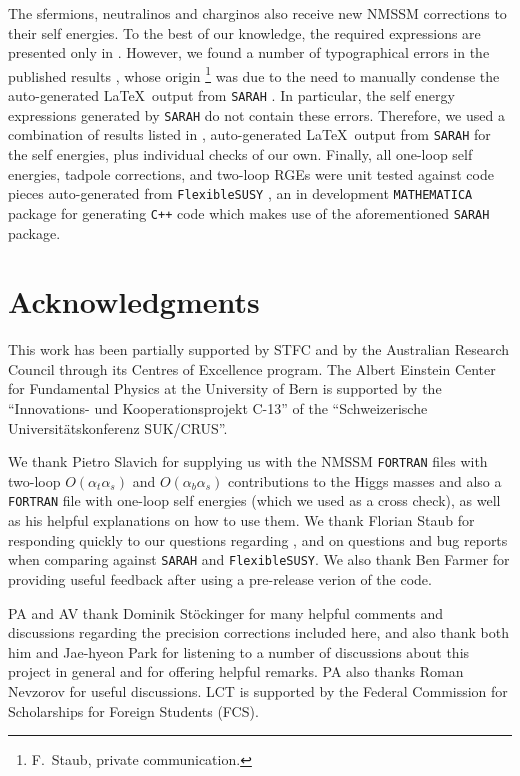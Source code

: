 \documentclass[final,3p,times,pdflatex]{elsarticle}
\def\at{\alpha_t}
\def\ab{\alpha_b}
\def\as{\alpha_s}
\def\oatas{O(\at\as)}
\def\oabas{O(\ab\as)}
\begin{document}
The sfermions, neutralinos and charginos also receive new NMSSM corrections to 
their self energies. To the best of our knowledge, the required expressions are 
presented only in \cite{Staub:2010ty}. However, we found a number of 
typographical errors in the published results \cite{Staub:2010ty}, whose 
origin%
\footnote{F.~Staub, private communication.} 
was due to the need to manually condense the auto-generated \LaTeX~output from 
{\tt SARAH} \cite{Staub:2009bi,Staub:2010jh,Staub:2012pb,Staub:2013tta}.  In 
particular, the self energy expressions generated by {\tt SARAH} do not contain 
these errors. Therefore, we used a combination of results listed in 
\cite{Staub:2010ty}, auto-generated \LaTeX~output from {\tt SARAH} for the self 
energies, plus individual checks of our own.
Finally, all one-loop self energies, tadpole corrections, and two-loop RGEs were
 unit tested against code pieces auto-generated from {\tt FlexibleSUSY} 
\cite{flexi-susy}, an in development {\tt MATHEMATICA} package for generating 
{\tt C++} code which makes use of the aforementioned {\tt SARAH} package. 


\section*{Acknowledgments}
This work has been partially supported by STFC 
and by the Australian Research Council through its Centres of Excellence 
program. The Albert Einstein Center for Fundamental Physics at the University 
of Bern is supported by the ``Innovations- und Kooperationsprojekt C-13'' of the
 ``Schweizerische Universit\"{a}tskonferenz SUK/CRUS''.

We thank Pietro Slavich for supplying us with the NMSSM {\tt FORTRAN} files with
two-loop $\oatas$ and $\oabas$ contributions to the Higgs masses and also a
{\tt FORTRAN} file with one-loop self energies (which we used as a cross check),
 as well as his helpful explanations on how to use them. We thank Florian 
Staub for responding quickly to our questions regarding \cite{Staub:2010ty}, and
 on questions and bug reports when comparing against {\tt SARAH} and 
{\tt FlexibleSUSY}. We also thank Ben Farmer for providing useful feedback after
 using a pre-release verion of the code.  

PA and AV thank Dominik St\"ockinger for many helpful comments and discussions 
regarding the precision corrections included here, and also thank both him and 
Jae-hyeon Park for listening to a number of discussions about this project in 
general and for offering helpful remarks. PA also thanks Roman Nevzorov for 
useful discussions.  LCT is supported by the Federal Commission for Scholarships
 for Foreign Students (FCS).  
\end{document}

